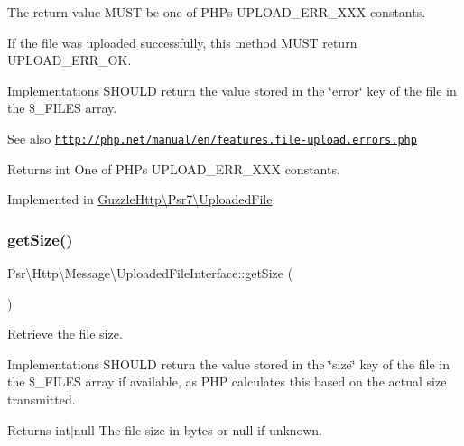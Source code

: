 The return value M\+U\+ST be one of P\+HP\textquotesingle{}s U\+P\+L\+O\+A\+D\+\_\+\+E\+R\+R\+\_\+\+X\+XX constants.

If the file was uploaded successfully, this method M\+U\+ST return U\+P\+L\+O\+A\+D\+\_\+\+E\+R\+R\+\_\+\+OK.

Implementations S\+H\+O\+U\+LD return the value stored in the \char`\"{}error\char`\"{} key of the file in the \$\+\_\+\+F\+I\+L\+ES array.

\begin{DoxySeeAlso}{See also}
\href{http://php.net/manual/en/features.file-upload.errors.php}{\tt http\+://php.\+net/manual/en/features.\+file-\/upload.\+errors.\+php} 
\end{DoxySeeAlso}
\begin{DoxyReturn}{Returns}
int One of P\+HP\textquotesingle{}s U\+P\+L\+O\+A\+D\+\_\+\+E\+R\+R\+\_\+\+X\+XX constants. 
\end{DoxyReturn}


Implemented in \hyperlink{classGuzzleHttp_1_1Psr7_1_1UploadedFile_abf88819e67fdc112aa01fcd722e784d4}{Guzzle\+Http\textbackslash{}\+Psr7\textbackslash{}\+Uploaded\+File}.

\mbox{\label{interfacePsr_1_1Http_1_1Message_1_1UploadedFileInterface_a6fabb21af5c4053e1d561018a5d30051}} 
\subsubsection{\texorpdfstring{get\+Size()}{getSize()}}
{\footnotesize\ttfamily Psr\textbackslash{}\+Http\textbackslash{}\+Message\textbackslash{}\+Uploaded\+File\+Interface\+::get\+Size (\begin{DoxyParamCaption}{ }\end{DoxyParamCaption})}

Retrieve the file size.

Implementations S\+H\+O\+U\+LD return the value stored in the \char`\"{}size\char`\"{} key of the file in the \$\+\_\+\+F\+I\+L\+ES array if available, as P\+HP calculates this based on the actual size transmitted.

\begin{DoxyReturn}{Returns}
int$\vert$null The file size in bytes or null if unknown. 
\end{DoxyReturn}


